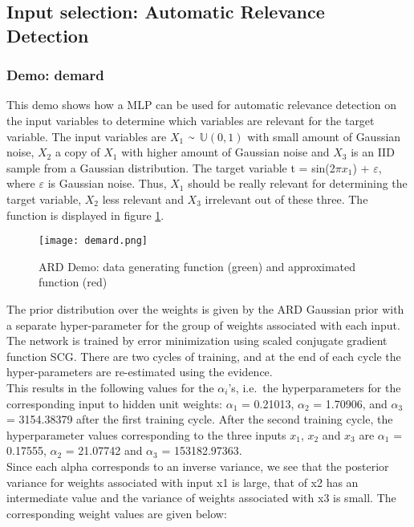 \documentclass[paper=a4, fontsize=11pt]{scrartcl} %
\newcommand{\mytilde}{\raise.17ex\hbox{$\scriptstyle\mathtt{\sim}$}}
\numberwithin{equation}{section} %
\begin{document}
\subsection{Input selection: Automatic Relevance Detection}
\subsubsection*{Demo: demard}

This demo shows how a MLP can be used for automatic relevance detection on the input variables to determine which variables are relevant for the target variable. The input variables are $X_1$ $\mytilde$ $\mathbb{U}(0,1)$ with small amount of Gaussian noise, $X_2$ a copy of $X_1$ with higher amount of Gaussian noise and $X_3$ is an IID sample from a Gaussian distribution. The target variable t = sin(2$\pi x_1$) + $\varepsilon$, where $\varepsilon$ is Gaussian noise. Thus, $X_1$ should be really relevant for determining the target variable, $X_2$ less relevant and $X_3$ irrelevant out of these three. The function is displayed in figure \ref{demard}.

\begin{figure}[H]
\centering
\texttt{[image: demard.png]}
\caption{ARD Demo: data generating function (green) and approximated function (red)}
\label{demard}
\end{figure}

The prior distribution over the weights is given by the ARD Gaussian prior with a separate hyper-parameter for the group of weights associated with each input. The network is trained by error minimization using scaled conjugate gradient function SCG. There are two cycles of training, and at the end of each cycle the hyper-parameters are re-estimated using the evidence.\\

This results in the following values for the $\alpha_i$'s, i.e.\, the hyperparameters for the corresponding input to hidden unit weights: $\alpha_1$ = 0.21013, $\alpha_2$ = 1.70906, and $\alpha_3$ = 3154.38379 after the first training cycle. After the second training cycle, the hyperparameter values corresponding to the three inputs $x_1$, $x_2$ and $x_3$ are $\alpha_1$ = 0.17555, $\alpha_2$ = 21.07742 and $\alpha_3$ = 153182.97363.\\
 
Since each alpha corresponds to an inverse variance, we see that the posterior variance for weights associated with input x1 is large, that of x2 has an intermediate value and the variance of weights associated with x3 is small. The corresponding weight values are given below:
\end{document}
